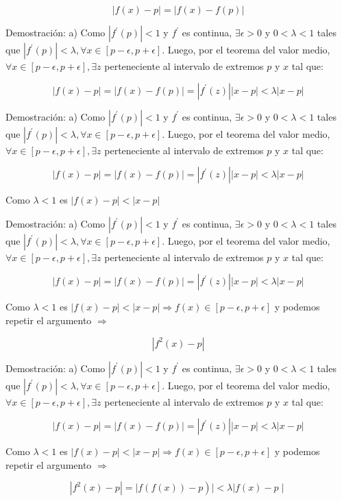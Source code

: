 \documentclass[11pt]{beamer}
\begin{document}
$$
|f(x)-p|=|f(x)-f(p)|
$$

Demostración: a) Como $\left|f^{\prime}(p)\right|<1$ y $f^{\prime}$ es continua, $\exists \epsilon>0$ y $0<\lambda<1$ tales que $\left|f^{\prime}(p)\right|<\lambda, \forall x \in[p-\epsilon, p+\epsilon]$. Luego, por el teorema del valor medio, $\forall x \in[p-\epsilon, p+\epsilon], \exists z$ perteneciente al intervalo de extremos $p$ y $x$ tal que:

$$
|f(x)-p|=|f(x)-f(p)|=\left|f^{\prime}(z)\right||x-p|<\lambda|x-p|
$$

Demostración: a) Como $\left|f^{\prime}(p)\right|<1$ y $f^{\prime}$ es continua, $\exists \epsilon>0$ y $0<\lambda<1$ tales que $\left|f^{\prime}(p)\right|<\lambda, \forall x \in[p-\epsilon, p+\epsilon]$. Luego, por el teorema del valor medio, $\forall x \in[p-\epsilon, p+\epsilon], \exists z$ perteneciente al intervalo de extremos $p$ y $x$ tal que:

$$
|f(x)-p|=|f(x)-f(p)|=\left|f^{\prime}(z)\right||x-p|<\lambda|x-p|
$$

Como $\lambda<1$ es $|f(x)-p|<|x-p|$

Demostración: a) Como $\left|f^{\prime}(p)\right|<1$ y $f^{\prime}$ es continua, $\exists \epsilon>0$ y $0<\lambda<1$ tales que $\left|f^{\prime}(p)\right|<\lambda, \forall x \in[p-\epsilon, p+\epsilon]$. Luego, por el teorema del valor medio, $\forall x \in[p-\epsilon, p+\epsilon], \exists z$ perteneciente al intervalo de extremos $p$ y $x$ tal que:

$$
|f(x)-p|=|f(x)-f(p)|=\left|f^{\prime}(z)\right||x-p|<\lambda|x-p|
$$

Como $\lambda<1$ es $|f(x)-p|<|x-p| \Longrightarrow f(x) \in[p-\epsilon, p+\epsilon]$ y podemos repetir el argumento $\Longrightarrow$

$$
\left|f^{2}(x)-p\right|
$$

Demostración: a) Como $\left|f^{\prime}(p)\right|<1$ y $f^{\prime}$ es continua, $\exists \epsilon>0$ y $0<\lambda<1$ tales que $\left|f^{\prime}(p)\right|<\lambda, \forall x \in[p-\epsilon, p+\epsilon]$. Luego, por el teorema del valor medio, $\forall x \in[p-\epsilon, p+\epsilon], \exists z$ perteneciente al intervalo de extremos $p$ y $x$ tal que:

$$
|f(x)-p|=|f(x)-f(p)|=\left|f^{\prime}(z)\right||x-p|<\lambda|x-p|
$$

Como $\lambda<1$ es $|f(x)-p|<|x-p| \Longrightarrow f(x) \in[p-\epsilon, p+\epsilon]$ y podemos repetir el argumento $\Longrightarrow$

$$
\left.\left|f^{2}(x)-p\right|=\mid f(f(x))-p\right)|<\lambda| f(x)-p \mid
$$
\end{document}
